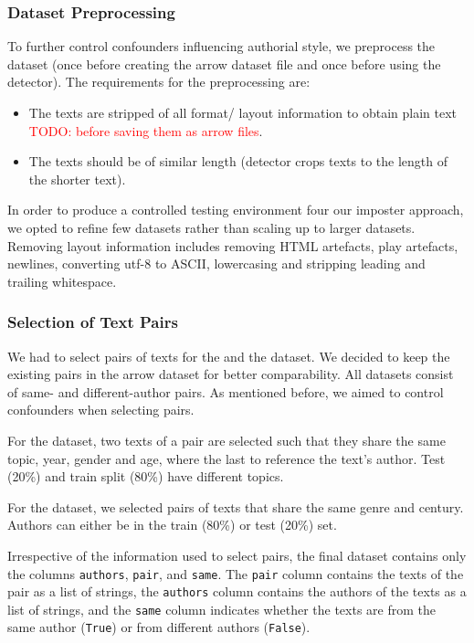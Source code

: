 \subsubsection{Dataset Preprocessing}
\label{subsubsec:dataset_preprocessing}

To further control confounders influencing authorial style, we preprocess the dataset 
(once before creating the arrow dataset file and once before using the detector).
The requirements for the preprocessing are:
\begin{itemize}
    \item The texts are stripped of all format/ layout information to obtain plain text \textcolor{red}{TODO: before saving them as arrow files}.
    \item The texts should be of similar length (detector crops texts to the length of the shorter text).
\end{itemize}
In order to produce a controlled testing environment four our imposter approach, 
we opted to refine few datasets rather than scaling up to larger datasets.
Removing layout information includes removing HTML artefacts, play artefacts, newlines, 
converting utf-8 to ASCII, lowercasing and stripping leading and trailing whitespace.

\subsubsection{Selection of Text Pairs}
\label{subsubsec:dataset_text_pair_selection}

We had to select pairs of texts for the \dataBlog{} and the \dataGutenberg{} dataset.
We decided to keep the existing pairs in the \dataPan{} arrow dataset for better comparability.
All datasets consist of same- and different-author pairs. 
As mentioned before, we aimed to control confounders when selecting pairs.

For the \dataBlog{} dataset, 
two texts of a pair are selected such that they share the same topic, year, gender and age, where the last to reference the text's author.
Test (20\%) and train split (80\%) have different topics.

For the \dataGutenberg{} dataset,
we selected pairs of texts that share the same genre and century.
Authors can either be in the train (80\%) or test (20\%) set.

Irrespective of the information used to select pairs, the final dataset contains only the columns \texttt{authors}, \texttt{pair}, and \texttt{same}.
The \texttt{pair} column contains the texts of the pair as a list of strings,
the \texttt{authors} column contains the authors of the texts as a list of strings,
and the \texttt{same} column indicates whether the texts are from the same author (\texttt{True}) or from different authors (\texttt{False}).

